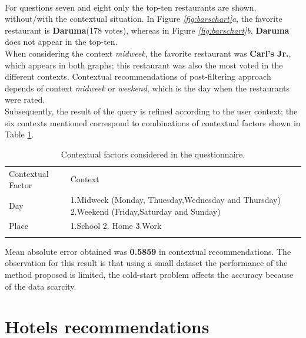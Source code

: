 \\For questions seven and eight only the top-ten restaurants are shown,
without/with the contextual situation. In Figure  \textit{\ref{fig:barschart}a},
the favorite restaurant is \textbf{Daruma}(178 votes),  whereas in
Figure  \textit{\ref{fig:barschart}b}, \textbf{Daruma} does not appear in the
top-ten. \\When considering the context \textit{midweek}, the favorite
restaurant was \textbf{Carl's Jr.}, which appears in both graphs; this
restaurant was also the most voted in the different contexts.
Contextual recommendations of post-filtering approach depends of
context \textit{midweek} or \textit{weekend}, which is the day when
the restaurants were rated. \\Subsequently, the result of the query is
refined according to the user context; the six contexts mentioned
correspond to combinations of contextual factors shown in 
Table  \ref{tab:contextstijuana}.
\begin{table}
\small
\captionsetup{font=footnotesize}
\caption{Contextual factors considered in the questionnaire.}
\label{tab:contextstijuana} 
\centering
\begin{tabular}{p{2.0cm} p{10cm} }
\hline\noalign{\smallskip}
Contextual Factor & Context \\
\noalign{\smallskip}\hline\noalign{\smallskip}
\small{Day} & \small{1.Midweek (Monday, Thuesday,Wednesday and Thursday)
2.Weekend (Friday,Saturday and Sunday)}  \\ \hline 
\small{Place} & \small{1.School 2. Home 3.Work} \\ 
\noalign{\smallskip}\hline
\end{tabular}
\end{table}
Mean absolute error obtained was \textbf{0.5859}  in contextual
recommendations.  The observation for this result is that using a
small dataset the performance of the method proposed is limited, the
cold-start  problem affects the accuracy because of the data scarcity.

\section{Hotels recommendations} \label{hotels}

